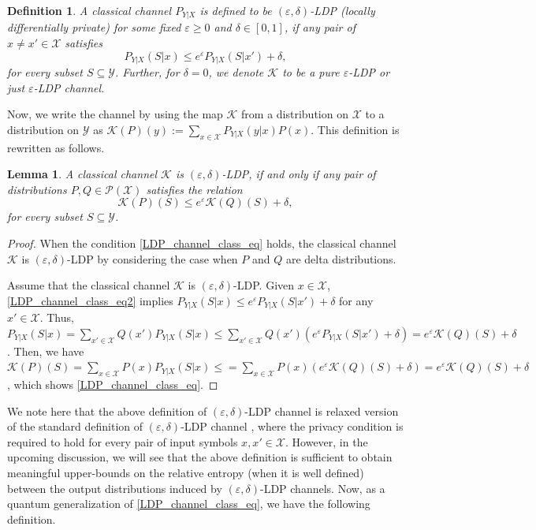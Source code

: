 \documentclass[onecolumn,ldraftcls, 11pt]{IEEEtran}
\newcommand{\eps}{\varepsilon}
\newcommand*{\cP}{\mathcal{P}}
\newcommand*{\cK}{\mathcal{K}}
\newcommand*{\cX}{\mathcal{X}}
\newcommand*{\cY}{\mathcal{Y}}
\newtheorem{definition}{Definition}
\newtheorem{lemma}{Lemma}
\begin{document}
\begin{definition}\label{LDP_channel_class2}
    A classical channel $P_{Y|X}$
    is defined to be $(\eps,\delta)$-LDP (locally differentially private) for some fixed $\eps \geq 0$ and $\delta \in [0,1]$,
    if any pair of $x\neq x' \in \cX$ satisfies 
        \begin{equation}
        P_{Y|X}(S|x) \leq e^\eps P_{Y|X}(S|x')  + \delta, \label{LDP_channel_class_eq2}
    \end{equation}
for every subset $S \subseteq \cY$.
Further, for $\delta = 0$, we denote $\cK$ to be a pure $\eps$-LDP or just $\eps$-LDP channel.
\end{definition}

Now, we write the channel by using the map $\cK$ from 
a distribution on $\cX$ to a distribution on $\cY$ 
as $\cK(P)(y):= \sum_{x \in \cX} P_{Y|X}(y|x)P(x)$.
This definition is rewritten as follows.

\begin{lemma}\label{LDP_channel_class}
    A classical channel $\cK $ is $(\eps,\delta)$-LDP,
if and only if 
    any pair of distributions $P,Q\in \cP(\cX)$ satisfies 
    the relation
    \begin{equation}
        \cK(P)(S) \leq e^\eps \cK(Q)(S) + \delta, \label{LDP_channel_class_eq}
    \end{equation}
for every subset $S \subseteq \cY$.
\end{lemma}

\begin{proof}
When the condition \eqref{LDP_channel_class_eq} holds, 
the classical channel $\cK $ is $(\eps,\delta)$-LDP
by considering the case when $P$ and $Q$ are delta distributions.

Assume that 
the classical channel $\cK $ is $(\eps,\delta)$-LDP.
Given $x \in \cX$, \eqref{LDP_channel_class_eq2} implies 
$
P_{Y|X}(S|x) \leq e^\eps P_{Y|X}(S|x')  + \delta
$ for any $x'\in \cX$.
Thus, 
$P_{Y|X}(S|x) =
\sum_{x'\in \cX}Q(x') P_{Y|X}(S|x) \leq 
\sum_{x'\in \cX}Q(x')(e^\eps P_{Y|X}(S|x')  + \delta)
= e^\eps \cK(Q)(S)  + \delta$.
Then, we have
$\cK(P)(S)
=\sum_{x\in \cX}P(x) P_{Y|X}(S|x) 
\leq 
= \sum_{x\in \cX}P(x)
(e^\eps \cK(Q)(S)  + \delta)
=e^\eps \cK(Q)(S)  + \delta$, which shows \eqref{LDP_channel_class_eq}.
\end{proof}

We note here that the above definition of $(\eps,\delta)$-LDP channel is relaxed version of the standard definition of $(\eps,\delta)$-LDP channel \cite{Asoodeh24}, where the privacy condition is required to hold for every pair of input symbols $x,x' \in \cX$. 
However, in the upcoming discussion, we will see that the above definition is sufficient to obtain meaningful upper-bounds on the relative entropy (when it is well defined) between the output distributions induced by $(\eps,\delta)$-LDP channels.
Now, as a quantum generalization of \eqref{LDP_channel_class_eq}, 
we have the following definition.
\end{document}
